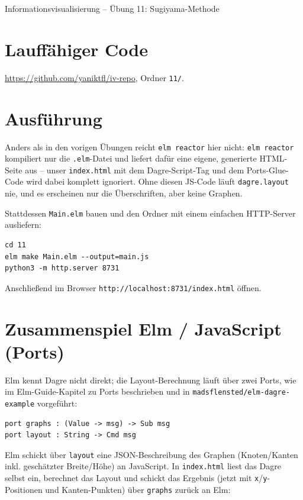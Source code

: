 \documentclass[11pt,a4paper]{article}
\begin{document}
\begin{center}
    {\Large Informationsvisualisierung -- Übung 11: Sugiyama-Methode}
\end{center}

\section*{Lauffähiger Code}

\href{https://github.com/yaniktfl/iv-repo}{https://github.com/yaniktfl/iv-repo},
Ordner \texttt{11/}.

\section*{Ausführung}

Anders als in den vorigen Übungen reicht \texttt{elm reactor} hier nicht:
\texttt{elm reactor} kompiliert nur die \texttt{.elm}-Datei und liefert dafür
eine eigene, generierte HTML-Seite aus -- unser \texttt{index.html} mit dem
Dagre-Script-Tag und dem Ports-Glue-Code wird dabei komplett ignoriert. Ohne
diesen JS-Code läuft \texttt{dagre.layout} nie, und es erscheinen nur die
Überschriften, aber keine Graphen.

Stattdessen \texttt{Main.elm} bauen und den Ordner mit einem einfachen
HTTP-Server ausliefern:

\begin{verbatim}
cd 11
elm make Main.elm --output=main.js
python3 -m http.server 8731
\end{verbatim}

Anschließend im Browser \texttt{http://localhost:8731/index.html} öffnen.

\section*{Zusammenspiel Elm / JavaScript (Ports)}

Elm kennt Dagre nicht direkt; die Layout-Berechnung läuft über zwei Ports,
wie im Elm-Guide-Kapitel zu Ports beschrieben und in
\texttt{madsflensted/elm-dagre-example} vorgeführt:

\begin{verbatim}
port graphs : (Value -> msg) -> Sub msg
port layout : String -> Cmd msg
\end{verbatim}

Elm schickt über \texttt{layout} eine JSON-Beschreibung des Graphen
(Knoten/Kanten inkl. geschätzter Breite/Höhe) an JavaScript. In
\texttt{index.html} liest das Dagre selbst ein, berechnet das Layout und
schickt das Ergebnis (jetzt mit \texttt{x}/\texttt{y}-Positionen und
Kanten-Punkten) über \texttt{graphs} zurück an Elm:
\end{document}
